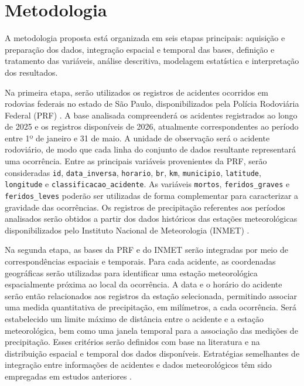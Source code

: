 \documentclass[12pt]{article}
\begin{document}
\section{Metodologia}

A metodologia proposta está organizada em seis etapas principais: aquisição e preparação dos dados, integração espacial e temporal das bases, definição e tratamento das variáveis, análise descritiva, modelagem estatística e interpretação dos resultados.

Na primeira etapa, serão utilizados os registros de acidentes ocorridos em rodovias federais no estado de São Paulo, disponibilizados pela Polícia Rodoviária Federal (PRF) \cite{prf2026}. A base analisada compreenderá os acidentes registrados ao longo de 2025 e os registros disponíveis de 2026, atualmente correspondentes ao período entre 1º de janeiro e 31 de maio. A unidade de observação será o acidente rodoviário, de modo que cada linha do conjunto de dados resultante representará uma ocorrência. Entre as principais variáveis provenientes da PRF, serão consideradas \verb|id|, \verb|data_inversa|, \verb|horario|, \verb|br|, \verb|km|, \verb|municipio|, \verb|latitude|, \verb|longitude| e \verb|classificacao_acidente|. As variáveis \verb|mortos|, \verb|feridos_graves| e \verb|feridos_leves| poderão ser utilizadas de forma complementar para caracterizar a gravidade das ocorrências. Os registros de precipitação referentes aos períodos analisados serão obtidos a partir dos dados históricos das estações meteorológicas disponibilizados pelo Instituto Nacional de Meteorologia (INMET) \cite{inmet2026}.

Na segunda etapa, as bases da PRF e do INMET serão integradas por meio de correspondências espaciais e temporais. Para cada acidente, as coordenadas geográficas serão utilizadas para identificar uma estação meteorológica espacialmente próxima ao local da ocorrência. A data e o horário do acidente serão então relacionados aos registros da estação selecionada, permitindo associar uma medida quantitativa de precipitação, em milímetros, a cada ocorrência. Será estabelecido um limite máximo de distância entre o acidente e a estação meteorológica, bem como uma janela temporal para a associação das medições de precipitação. Esses critérios serão definidos com base na literatura e na distribuição espacial e temporal dos dados disponíveis. Estratégias semelhantes de integração entre informações de acidentes e dados meteorológicos têm sido empregadas em estudos anteriores \cite{silva2020,fuhr2026}.
\end{document}
